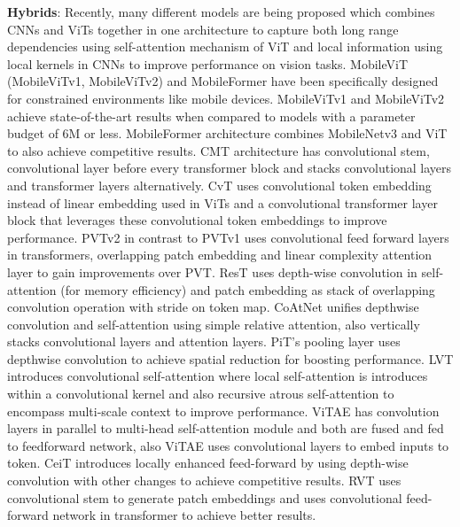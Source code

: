 \documentclass{article} \usepackage{iclr2022_conference,times}
\begin{document}
\textbf{Hybrids}: 
Recently, many different models are being proposed which combines CNNs and ViTs together in one architecture to capture both long range dependencies using self-attention mechanism of ViT and  local information using local kernels in CNNs to improve performance on vision tasks. 
MobileViT (MobileViTv1, MobileViTv2) \citep{mehta2021mobilevit} and MobileFormer \citep{chen2022mobile} have been specifically designed for constrained environments like mobile devices. 
MobileViTv1 and MobileViTv2 achieve state-of-the-art results when compared to models with a parameter budget of 6M or less. 
MobileFormer architecture combines MobileNetv3 and ViT to also achieve competitive results. 
CMT \citep{guo2022cmt} architecture has convolutional stem, convolutional layer before every transformer block and stacks convolutional layers and transformer layers alternatively. 
CvT \citep{wu2021cvt} uses convolutional token embedding instead of linear embedding used in ViTs and a convolutional transformer layer block that leverages these convolutional token embeddings to improve performance. 
PVTv2 \citep{wang2022pvt} in contrast to PVTv1 uses convolutional feed forward layers in transformers, overlapping patch embedding and linear complexity attention layer to gain improvements over PVT. 
ResT \citep{zhang2021rest} uses depth-wise convolution in self-attention (for memory efficiency) and patch embedding as stack of overlapping convolution operation with stride on token map. 
CoAtNet \citep{dai2021coatnet} unifies depthwise convolution and self-attention using simple relative attention, also vertically stacks convolutional layers and attention layers. 
PiT's \citep{heo2021rethinking} pooling layer uses depthwise convolution to achieve spatial reduction for boosting performance. 
LVT \citep{yang2022lite} introduces convolutional self-attention where local self-attention is introduces within a convolutional kernel and also recursive atrous self-attention to encompass multi-scale context  to improve performance. 
ViTAE \citep{xu2021vitae} has convolution layers in parallel to multi-head self-attention module and both are fused and fed to feedforward network, also ViTAE uses convolutional layers to embed inputs to token.
CeiT \citep{yuan2021incorporating} introduces locally enhanced feed-forward by using depth-wise convolution with other changes to achieve competitive results. 
RVT \citep{mao2022towards} uses convolutional stem to generate patch embeddings and uses convolutional feed-forward network in transformer to achieve better results.  
\end{document}
